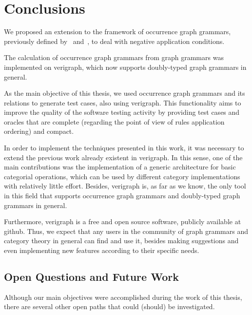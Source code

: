 \chapter{Conclusions}\label{ch:conclusions}

  We proposed an extension to the framework of occurrence graph grammars, previously defined by~\cite{Ribeiro1996} and~\cite{Corradini1996},  to deal with negative application conditions.

  The calculation of occurrence graph grammars from graph grammars was implemented on verigraph, which now supports doubly-typed graph grammars in general.

  As the main objective of this thesis, we used occurrence graph grammars and its relations to generate test cases, also using verigraph. This functionality aims to improve the quality of the software testing activity by providing test cases and oracles that are complete (regarding the point of view of rules application ordering) and compact.

  In order to implement the techniques presented in this work, it was necessary to extend the previous work already existent in verigraph. In this sense, one of the main contributions was the implementation of a generic architecture for basic categorial operations, which can be used by different category implementations with relatively little effort. Besides, verigraph is, as far as we know, the only tool in this field that supports occurrence graph grammars and doubly-typed graph grammars in general.

    Furthermore, verigraph is a free and open source software, publicly available at github. Thus, we expect that any users in the community of graph grammars and category theory in general can find and use it, besides making suggestions and even implementing new features according to their specific needs.

\section{Open Questions and Future Work}

Although our main objectives were accomplished during the work of this thesis, there are several other open paths that could (should) be investigated. 


